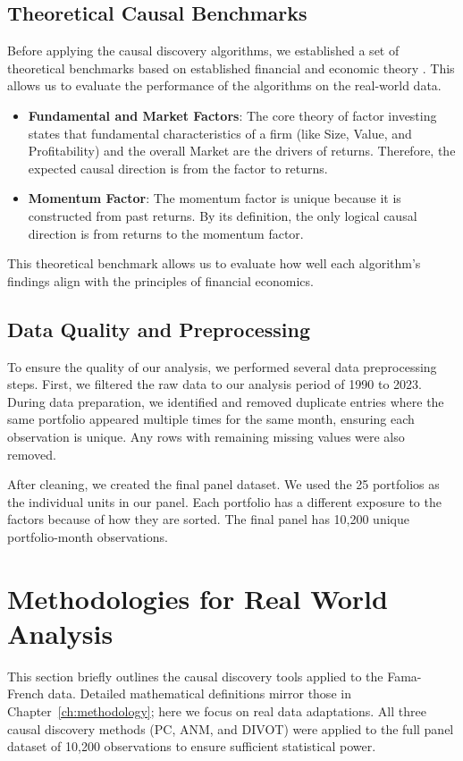 \subsection*{Theoretical Causal Benchmarks}
Before applying the causal discovery algorithms, we established a set of theoretical benchmarks based on established financial and economic theory \cite{FamaFrench93, Lopez23}. This allows us to evaluate the performance of the algorithms on the real-world data.
\begin{itemize}
    \item \textbf{Fundamental and Market Factors}: The core theory of factor investing states that fundamental characteristics of a firm (like Size, Value, and Profitability) and the overall Market are the drivers of returns. Therefore, the expected causal direction is from the factor to returns.
    \item \textbf{Momentum Factor}: The momentum factor is unique because it is constructed from past returns. By its definition, the only logical causal direction is from returns to the momentum factor.
\end{itemize}
This theoretical benchmark allows us to evaluate how well each algorithm's findings align with the principles of financial economics.

\subsection*{Data Quality and Preprocessing}
To ensure the quality of our analysis, we performed several data preprocessing steps. First, we filtered the raw data to our analysis period of 1990 to 2023. During data preparation, we identified and removed duplicate entries where the same portfolio appeared multiple times for the same month, ensuring each observation is unique. Any rows with remaining missing values were also removed.

After cleaning, we created the final panel dataset. We used the 25 portfolios as the individual units in our panel. Each portfolio has a different exposure to the factors because of how they are sorted. The final panel has 10,200 unique portfolio-month observations.

\section{Methodologies for Real World Analysis}
\label{sec:real_methods}

This section briefly outlines the causal discovery tools applied to the Fama-French data. Detailed mathematical definitions mirror those in Chapter~\ref{ch:methodology}; here we focus on real data adaptations. All three causal discovery methods (PC, ANM, and DIVOT) were applied to the full panel dataset of 10,200 observations to ensure sufficient statistical power.

